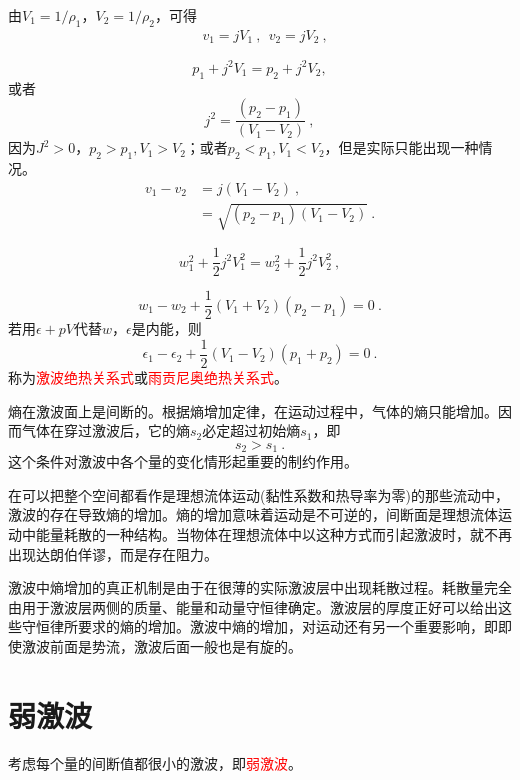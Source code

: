 \documentclass[12pt,a4paper]{article}
\begin{document}
由$V_1 = 1/\rho_1$，$V_2 = 1/\rho_2$，可得
\begin{align}
& v_1 = j V_1 ~, ~~ v_2 = j V_2 ~,
\end{align}

\begin{equation}
p_1 + j^2 V_1 = p_2 +j^2 V_2, 
\end{equation}
或者
\begin{equation}
j^2 = \dfrac{(p_2 -p_1)}{(V_1 -V_2)} ~,
\end{equation}
因为$J^2 > 0$，$p_2 > p_1, V_1 > V_2$；或者$p_2 < p_1, V_1 < V_2$，但是实际只能出现一种情况。
\begin{align}
\nonumber v_1 -v_2 & = j(V_1 -V_2) ~, \\
& = \sqrt{(p_2 -p_1)(V_1-V_2)}  ~.
\end{align}

\begin{equation}
w_1^2 +\dfrac{1}{2} j^2 V_1^2 = w_2^2 +\dfrac{1}{2} j^2 V_2^2 ~,
\end{equation}

\begin{equation}
w_1 -w_2 + \dfrac{1}{2} (V_1 +V_2)(p_2 -p_1) = 0 ~.
\end{equation}
若用$\epsilon +pV$代替$w$，$\epsilon$是内能，则
\begin{equation}
\epsilon_1 -\epsilon_2 + \dfrac{1}{2} (V_1 -V_2)(p_1 +p_2) = 0 ~.
\end{equation}
称为\textcolor{red}{激波绝热关系式}或\textcolor{red}{雨贡尼奥绝热关系式}。

熵在激波面上是间断的。根据熵增加定律，在运动过程中，气体的熵只能增加。因而气体在穿过激波后，它的熵$s_2$必定超过初始熵$s_1$，即
\begin{equation}
s_2 > s_1 ~.
\end{equation}
这个条件对激波中各个量的变化情形起重要的制约作用。

在可以把整个空间都看作是理想流体运动(黏性系数和热导率为零)的那些流动中，激波的存在导致熵的增加。熵的增加意味着运动是不可逆的，间断面是理想流体运动中能量耗散的一种结构。当物体在理想流体中以这种方式而引起激波时，就不再出现达朗伯佯谬，而是存在阻力。

激波中熵增加的真正机制是由于在很薄的实际激波层中出现耗散过程。耗散量完全由用于激波层两侧的质量、能量和动量守恒律确定。激波层的厚度正好可以给出这些守恒律所要求的熵的增加。激波中熵的增加，对运动还有另一个重要影响，即即使激波前面是势流，激波后面一般也是有旋的。

\section{弱激波}
考虑每个量的间断值都很小的激波，即\textcolor{red}{弱激波}。
\end{document}
